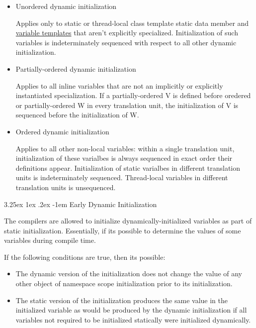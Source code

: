 \documentclass[a4paper, 12pt]{extbook}
\makeatletter
\renewcommand\paragraph{\@startsection{paragraph}{5}{\z@}%
  {3.25ex \@plus1ex \@minus.2ex}%
  {-1em}%
  {\normalfont\normalsize\bfseries}}
\makeatother
\begin{document}
\begin{itemize}
  \item Unordered dynamic initialization

        Applies only to static or thread-local class template static data member and \hyperref[appendix:templates:variable_template]{variable templates} that aren't explicitly specialized.
        Initialization of such variables is indeterminately sequenced with respect to all other dynamic initialization.

  \item Partially-ordered dynamic initialization

        Applies to all inline variables that are not an implicitly or explicitly instantiated specialization.
        If a partially-ordered V is defined before oredered or partially-ordered W in every translation unit, the initialization of V is sequenced before the initialization of W.

  \item Ordered dynamic initialization

        Applies to all other non-local variables:
        within a single translation unit, initialization of these varialbes is always sequenced in exact order their definitions appear.
        Initialization of static varialbes in different translation units is indeterminately sequenced.
        Thread-local variables in different translation units is unsequenced.

\end{itemize}

\paragraph{Early Dynamic Initialization}

The compilers are allowed to initialize dynamically-initialized variables as part of static initialization.
Essentially, if its possible to determine the values of some variables during compile time.

If the following conditions are true, then its possible:

\begin{itemize}
  \item The dynamic version of the initialization does not change the value of any other object of namespace scope initialization prior to its initialization.
  \item The static version of the initialization produces the same value in the initialized variable as would be produced by the dynamic initialization if all variables not required to be initialized statically were initialized dynamically.
\end{itemize}
\end{document}
